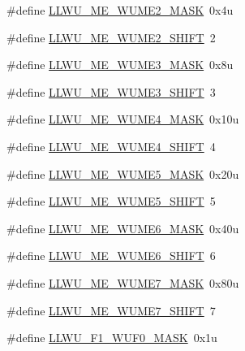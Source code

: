 \begin{DoxyCompactItemize}
\#define \hyperlink{group___l_l_w_u___register___masks_ga9f19f501dd2ad4aa2f7b01ac8edf8056}{L\+L\+W\+U\+\_\+\+M\+E\+\_\+\+W\+U\+M\+E2\+\_\+\+M\+A\+SK}~0x4u
\item 
\#define \hyperlink{group___l_l_w_u___register___masks_ga383c567df0dbc9edf2773d29676a7b30}{L\+L\+W\+U\+\_\+\+M\+E\+\_\+\+W\+U\+M\+E2\+\_\+\+S\+H\+I\+FT}~2
\item 
\#define \hyperlink{group___l_l_w_u___register___masks_ga6f6ea286130568de4df073a50fbdc282}{L\+L\+W\+U\+\_\+\+M\+E\+\_\+\+W\+U\+M\+E3\+\_\+\+M\+A\+SK}~0x8u
\item 
\#define \hyperlink{group___l_l_w_u___register___masks_ga394f6049d44881fafbc58b62e3ea8f44}{L\+L\+W\+U\+\_\+\+M\+E\+\_\+\+W\+U\+M\+E3\+\_\+\+S\+H\+I\+FT}~3
\item 
\#define \hyperlink{group___l_l_w_u___register___masks_ga4b7fa4566d64069e93d5bf9bf69efcf4}{L\+L\+W\+U\+\_\+\+M\+E\+\_\+\+W\+U\+M\+E4\+\_\+\+M\+A\+SK}~0x10u
\item 
\#define \hyperlink{group___l_l_w_u___register___masks_gad162d87bd892f7bfcd34c74941168e64}{L\+L\+W\+U\+\_\+\+M\+E\+\_\+\+W\+U\+M\+E4\+\_\+\+S\+H\+I\+FT}~4
\item 
\#define \hyperlink{group___l_l_w_u___register___masks_gadeab309cd88e84e94433398ea4656511}{L\+L\+W\+U\+\_\+\+M\+E\+\_\+\+W\+U\+M\+E5\+\_\+\+M\+A\+SK}~0x20u
\item 
\#define \hyperlink{group___l_l_w_u___register___masks_ga8eb531aa288bc7d32d75950b7bf9b1a5}{L\+L\+W\+U\+\_\+\+M\+E\+\_\+\+W\+U\+M\+E5\+\_\+\+S\+H\+I\+FT}~5
\item 
\#define \hyperlink{group___l_l_w_u___register___masks_ga4f4902c05f5e93174a1ef5afaa426d01}{L\+L\+W\+U\+\_\+\+M\+E\+\_\+\+W\+U\+M\+E6\+\_\+\+M\+A\+SK}~0x40u
\item 
\#define \hyperlink{group___l_l_w_u___register___masks_gaba71957dbca47b2dd3aaec44106b013e}{L\+L\+W\+U\+\_\+\+M\+E\+\_\+\+W\+U\+M\+E6\+\_\+\+S\+H\+I\+FT}~6
\item 
\#define \hyperlink{group___l_l_w_u___register___masks_ga455f995ef197eea9796910ff1b7327a0}{L\+L\+W\+U\+\_\+\+M\+E\+\_\+\+W\+U\+M\+E7\+\_\+\+M\+A\+SK}~0x80u
\item 
\#define \hyperlink{group___l_l_w_u___register___masks_ga1676e95c4d2477005c4c37ee97b45db3}{L\+L\+W\+U\+\_\+\+M\+E\+\_\+\+W\+U\+M\+E7\+\_\+\+S\+H\+I\+FT}~7
\item 
\#define \hyperlink{group___l_l_w_u___register___masks_ga1308a2e0d967a81b7fc32af6816cb532}{L\+L\+W\+U\+\_\+\+F1\+\_\+\+W\+U\+F0\+\_\+\+M\+A\+SK}~0x1u
\item 

\end{DoxyCompactItemize}

